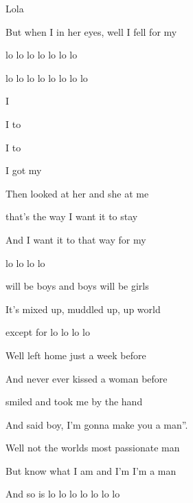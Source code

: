 \begin{SBSong}{Lola}
\begin{SBVerse}
    But when I  in her eyes, well I  fell for my 
                      
    lo lo lo lo   lo lo lo 
    
     lo lo lo lo  lo lo lo lo 
  \end{SBVerse}
  \CBPageBrk
  \begin{SBVerse}
    I   
                
    I  to  
       
    I  to  
         
    I got   my 
        
    Then  looked at her and she at me
  \end{SBVerse}
  
  \begin{SBVerse}     
     that's the way I want it to stay
              
    And I  want it to  that way for my 

     lo lo lo lo 
  \end{SBVerse}
  \begin{SBVerse}
     will be boys and boys will be girls
                                                                                     
    It's  mixed up, muddled up,  up world 

    except for  lo lo lo lo 
  \end{SBVerse}
  \WBPageBrk
  \begin{SBVerse}         
    Well  left home just a week before
             
    And  never ever kissed a woman before
     
     smiled and took me by the hand 
    
    And said  boy, I'm gonna make you a man''.
  \end{SBVerse}
  \begin{SBVerse}          
    Well  not the worlds most passionate man
                                                   
    But  know what I am and I'm  I'm a man
                                         
    And so is  lo lo lo lo   lo lo lo   
    \end{SBVerse}
\end{SBSong}
